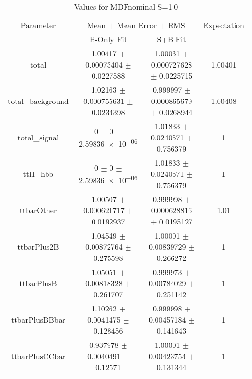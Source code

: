 \begin{table}
\centering
\caption{Values for MDFnominal S=1.0}
\begin{tabular}{cccc}
\toprule
Parameter & \multicolumn{2}{c}{Mean $\pm$ Mean Error $\pm$ RMS} & Expectation\\
 & B-Only Fit & S+B Fit & \\
\midrule
total & \num{1.00417} $\pm$ \num{0.00073404} $\pm$ \num{0.0227588} & \num{1.00031} $\pm$ \num{0.000727628} $\pm$ \num{0.0225715} & \num{1.00401}\\
total\_background & \num{1.02163} $\pm$ \num{0.000755631} $\pm$ \num{0.0234398} & \num{0.999997} $\pm$ \num{0.000865679} $\pm$ \num{0.0268944} & \num{1.00408}\\
total\_signal & \num{0} $\pm$ \num{0} $\pm$ \num{2.59836e-06} & \num{1.01833} $\pm$ \num{0.0240571} $\pm$ \num{0.756379} & \num{1}\\
ttH\_hbb & \num{0} $\pm$ \num{0} $\pm$ \num{2.59836e-06} & \num{1.01833} $\pm$ \num{0.0240571} $\pm$ \num{0.756379} & \num{1}\\
ttbarOther & \num{1.00507} $\pm$ \num{0.000621717} $\pm$ \num{0.0192937} & \num{0.999998} $\pm$ \num{0.000628816} $\pm$ \num{0.0195127} & \num{1.01}\\
ttbarPlus2B & \num{1.04549} $\pm$ \num{0.00872764} $\pm$ \num{0.275598} & \num{1.00001} $\pm$ \num{0.00839729} $\pm$ \num{0.266272} & \num{1}\\
ttbarPlusB & \num{1.05051} $\pm$ \num{0.00818328} $\pm$ \num{0.261707} & \num{0.999973} $\pm$ \num{0.00784029} $\pm$ \num{0.251142} & \num{1}\\
ttbarPlusBBbar & \num{1.10262} $\pm$ \num{0.0041475} $\pm$ \num{0.128456} & \num{0.999998} $\pm$ \num{0.00457184} $\pm$ \num{0.141643} & \num{1}\\
ttbarPlusCCbar & \num{0.937978} $\pm$ \num{0.0040491} $\pm$ \num{0.12571} & \num{1.00001} $\pm$ \num{0.00423754} $\pm$ \num{0.131344} & \num{1}\\
\bottomrule
\end{tabular}
\end{table}